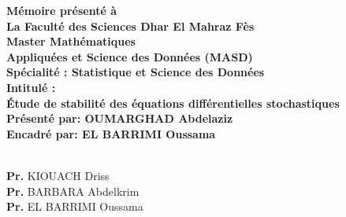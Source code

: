 \documentclass[A4paper,12pt]{report}
\begin{document}
\begin{titlepage}
\thispagestyle{empty}
\centering  
\vspace{0.6cm}
\textsf{\textbf{\large Mémoire présenté à \\La Faculté des Sciences Dhar El Mahraz Fès}}\\\vspace{0.3cm}
\textsf{\textbf{\LARGE Master Mathématiques \\ Appliquées et Science des Données (MASD)}}\\	\vspace{0.5cm}
\textsf{\textbf{\large Spécialité : Statistique et Science des Données}}\\	\vspace{0.5cm}
\textsf{\textbf{\large Intitulé :}}\vspace{0.2cm}
\noindent\makebox[\linewidth]{\rule{\linewidth}{1.2pt}}	
 \textcolor{blue!80!black}{\\\LARGE \LARGE \LARGE\LARGE \textsf{ \textbf{  Étude de stabilité des équations différentielles stochastiques}}}
\noindent\makebox[\linewidth]{\rule{\linewidth}{1.2pt}}
\vspace{0.12cm}
   \textsf{\large \\\textbf{Présenté par: OUMARGHAD Abdelaziz}}\\\vspace{0.13cm}
   \textsf{\large \textbf{Encadré par: EL BARRIMI Oussama}}\\\vspace{0.13cm}
   	\vspace{1.5cm}
	\smallskip
	\large {}  \\
	\vspace{0.5cm}
\begin{minipage}{0.4\textwidth}
    \begin{flushleft}
     \textsf{\textbf{Pr.} KIOUACH Driss}\\
     \textsf{\textbf{Pr.} BARBARA Abdelkrim}\\
     \textsf{\textbf{Pr.} EL BARRIMI Oussama}\\
    \end{flushleft}
\end{minipage}
\begin{minipage}{0.2\textwidth}

\end{minipage}
\end{titlepage}
\end{document}
